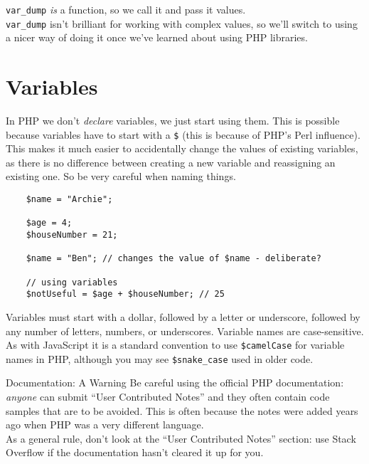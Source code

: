 \texttt{var\_dump} \textit{is} a function, so we call it and pass it values.
\\

\texttt{var\_dump} isn't brilliant for working with complex values, so we'll switch to using a nicer way of doing it once we've learned about using PHP libraries.


\section{Variables}

In PHP we don't \textit{declare} variables, we just start using them. This is possible because variables have to start with a \texttt{\$} (this is because of PHP's Perl influence).
\\

This makes it much easier to accidentally change the values of existing variables, as there is no difference between creating a new variable and reassigning an existing one. So be very careful when naming things.

\begin{verbatim}
    $name = "Archie";

    $age = 4;
    $houseNumber = 21;

    $name = "Ben"; // changes the value of $name - deliberate?

    // using variables
    $notUseful = $age + $houseNumber; // 25
\end{verbatim}

Variables must start with a dollar, followed by a letter or underscore, followed by any number of letters, numbers, or underscores. Variable names are case-sensitive.
\\

As with JavaScript it is a standard convention to use \texttt{\$camelCase} for variable names in PHP, although you may see \texttt{\$snake\_case} used in older code.


\begin{infobox}{Documentation: A Warning}
    Be careful using the official PHP documentation: \textit{anyone} can submit ``User Contributed Notes'' and they often contain code samples that are to be avoided. This is often because the notes were added years ago when PHP was a very different language.
    \\

    As a general rule, don't look at the ``User Contributed Notes'' section: use Stack Overflow if the documentation hasn't cleared it up for you.
\end{infobox}



